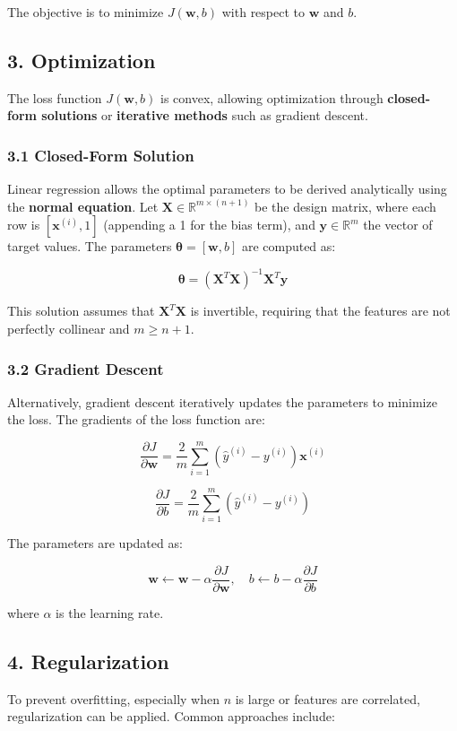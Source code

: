 \documentclass[a4paper,12pt]{article}
\begin{document}
The objective is to minimize $J(\mathbf{w}, b)$ with respect to $\mathbf{w}$ and $b$.

\subsection*{3. Optimization}
The loss function $J(\mathbf{w}, b)$ is convex, allowing optimization through \textbf{closed-form solutions} or \textbf{iterative methods} such as gradient descent.

\subsubsection*{3.1 Closed-Form Solution}
Linear regression allows the optimal parameters to be derived analytically using the \textbf{normal equation}. Let $\mathbf{X} \in \mathbb{R}^{m \times (n+1)}$ be the design matrix, where each row is $[\mathbf{x}^{(i)}, 1]$ (appending a 1 for the bias term), and $\mathbf{y} \in \mathbb{R}^m$ the vector of target values. The parameters $\boldsymbol{\theta} = [\mathbf{w}, b]$ are computed as:

\[
\boldsymbol{\theta} = (\mathbf{X}^T \mathbf{X})^{-1} \mathbf{X}^T \mathbf{y}
\]

This solution assumes that $\mathbf{X}^T \mathbf{X}$ is invertible, requiring that the features are not perfectly collinear and $m \geq n+1$.

\subsubsection*{3.2 Gradient Descent}
Alternatively, gradient descent iteratively updates the parameters to minimize the loss. The gradients of the loss function are:

\[
\frac{\partial J}{\partial \mathbf{w}} = \frac{2}{m} \sum_{i=1}^m (\hat{y}^{(i)} - y^{(i)}) \mathbf{x}^{(i)}
\]

\[
\frac{\partial J}{\partial b} = \frac{2}{m} \sum_{i=1}^m (\hat{y}^{(i)} - y^{(i)})
\]

The parameters are updated as:

\[
\mathbf{w} \leftarrow \mathbf{w} - \alpha \frac{\partial J}{\partial \mathbf{w}}, \quad b \leftarrow b - \alpha \frac{\partial J}{\partial b}
\]

where $\alpha$ is the learning rate.

\subsection*{4. Regularization}
To prevent overfitting, especially when $n$ is large or features are correlated, regularization can be applied. Common approaches include:
\end{document}
